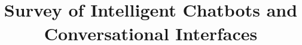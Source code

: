 \documentclass[paper=a4, fontsize=18pt]{article} %
\title{	
\normalfont \normalsize
\horrule{0.5pt} \\[0.4cm] %
\huge Survey of Intelligent Chatbots and Conversational Interfaces \\ %
\horrule{2pt} \\[0.5cm] %
}
\author{}
\numberwithin{equation}{section} %
\numberwithin{figure}{section} %
\numberwithin{table}{section} %
\begin{document}
\maketitle
\section*{}









%
%
%
%
%

%



\end{document}
